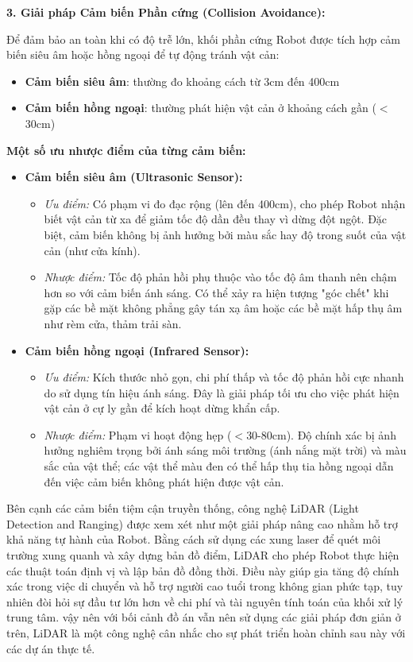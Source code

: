 \textbf{3. Giải pháp Cảm biến Phần cứng (Collision Avoidance):}

Để đảm bảo an toàn khi có độ trễ lớn, khối phần cứng Robot được tích hợp cảm biến siêu âm hoặc hồng ngoại để tự động tránh vật cản:

\begin{itemize}
    \item \textbf{Cảm biến siêu âm}: thường đo khoảng cách từ 3cm đến 400cm
    \item \textbf{Cảm biến hồng ngoại}: thường phát hiện vật cản ở khoảng cách gần ($<$30cm)
\end{itemize}

\textbf{Một số ưu nhược điểm của từng cảm biến:}

\begin{itemize} 
\item \textbf{Cảm biến siêu âm (Ultrasonic Sensor):} 
\begin{itemize} \item \textit{Ưu điểm:} Có phạm vi đo đạc rộng (lên đến 400cm), cho phép Robot nhận biết vật cản từ xa để giảm tốc độ dần đều thay vì dừng đột ngột. Đặc biệt, cảm biến không bị ảnh hưởng bởi màu sắc hay độ trong suốt của vật cản (như cửa kính). \item \textit{Nhược điểm:} Tốc độ phản hồi phụ thuộc vào tốc độ âm thanh nên chậm hơn so với cảm biến ánh sáng. Có thể xảy ra hiện tượng "góc chết" khi gặp các bề mặt không phẳng gây tán xạ âm hoặc các bề mặt hấp thụ âm như rèm cửa, thảm trải sàn. 
\end{itemize}  

\item \textbf{Cảm biến hồng ngoại (Infrared Sensor):}
\begin{itemize}
    \item \textit{Ưu điểm:} Kích thước nhỏ gọn, chi phí thấp và tốc độ phản hồi cực nhanh do sử dụng tín hiệu ánh sáng. Đây là giải pháp tối ưu cho việc phát hiện vật cản ở cự ly gần để kích hoạt dừng khẩn cấp.
    \item \textit{Nhược điểm:} Phạm vi hoạt động hẹp ($<$30-80cm). Độ chính xác bị ảnh hưởng nghiêm trọng bởi ánh sáng môi trường (ánh nắng mặt trời) và màu sắc của vật thể; các vật thể màu đen có thể hấp thụ tia hồng ngoại dẫn đến việc cảm biến không phát hiện được vật cản.
\end{itemize}
\end{itemize}

Bên cạnh các cảm biến tiệm cận truyền thống, công nghệ LiDAR (Light Detection and Ranging) được xem xét như một giải pháp nâng cao nhằm hỗ trợ khả năng tự hành của Robot. Bằng cách sử dụng các xung laser để quét môi trường xung quanh và xây dựng bản đồ điểm, LiDAR cho phép Robot thực hiện các thuật toán định vị và lập bản đồ đồng thời. Điều này giúp gia tăng độ chính xác trong việc di chuyển và hỗ trợ người cao tuổi trong không gian phức tạp, tuy nhiên đòi hỏi sự đầu tư lớn hơn về chi phí và tài nguyên tính toán của khối xử lý trung tâm. vậy nên với bối cảnh đồ án vẫn nên sử dụng các giải pháp đơn giản ở trên, LiDAR là một công nghệ cân nhắc cho sự phát triển hoàn chỉnh sau này với các dự án thực tế.

